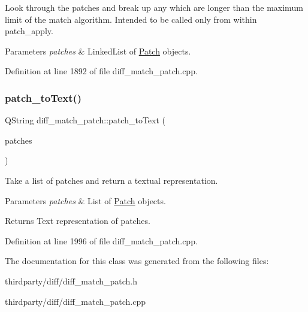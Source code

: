 Look through the patches and break up any which are longer than the maximum limit of the match algorithm. Intended to be called only from within patch\+\_\+apply. 
\begin{DoxyParams}{Parameters}
{\em patches} & Linked\+List of \hyperlink{class_patch}{Patch} objects. \\
\hline
\end{DoxyParams}


Definition at line 1892 of file diff\+\_\+match\+\_\+patch.\+cpp.

\mbox{\label{classdiff__match__patch_ab23a8022e207c5aa2fd2ee7dad604341}} 
\subsubsection{\texorpdfstring{patch\+\_\+to\+Text()}{patch\_toText()}}
{\footnotesize\ttfamily Q\+String diff\+\_\+match\+\_\+patch\+::patch\+\_\+to\+Text (\begin{DoxyParamCaption}\item[{const Q\+List$<$ \hyperlink{class_patch}{Patch} $>$ \&}]{patches }\end{DoxyParamCaption})}

Take a list of patches and return a textual representation. 
\begin{DoxyParams}{Parameters}
{\em patches} & List of \hyperlink{class_patch}{Patch} objects. \\
\hline
\end{DoxyParams}
\begin{DoxyReturn}{Returns}
Text representation of patches. 
\end{DoxyReturn}


Definition at line 1996 of file diff\+\_\+match\+\_\+patch.\+cpp.



The documentation for this class was generated from the following files\+:\begin{DoxyCompactItemize}
\item 
thirdparty/diff/diff\+\_\+match\+\_\+patch.\+h\item 
thirdparty/diff/diff\+\_\+match\+\_\+patch.\+cpp\end{DoxyCompactItemize}
